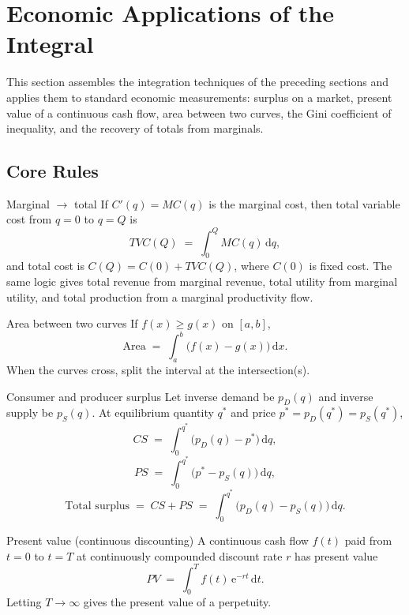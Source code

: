 \chapter{Economic Applications of the Integral}

This section assembles the integration techniques of the preceding
sections and applies them to standard economic measurements: surplus on
a market, present value of a continuous cash flow, area between two
curves, the Gini coefficient of inequality, and the recovery of totals
from marginals.

\section{Core Rules}

\begin{rulebox}{Marginal $\to$ total}
If $C'(q)=MC(q)$ is the marginal cost, then total variable cost from
$q=0$ to $q=Q$ is
\[
  TVC(Q) \;=\; \int_{0}^{Q} MC(q)\,\mathrm{d}q,
\]
and total cost is $C(Q)=C(0)+TVC(Q)$, where $C(0)$ is fixed cost. The
same logic gives total revenue from marginal revenue, total utility from
marginal utility, and total production from a marginal productivity
flow.
\end{rulebox}

\begin{rulebox}{Area between two curves}
If $f(x)\ge g(x)$ on $[a,b]$,
\[
  \text{Area} \;=\; \int_{a}^{b} \bigl(f(x)-g(x)\bigr)\,\mathrm{d}x .
\]
When the curves cross, split the interval at the intersection(s).
\end{rulebox}

\begin{rulebox}{Consumer and producer surplus}
Let inverse demand be $p_D(q)$ and inverse supply be $p_S(q)$. At
equilibrium quantity $q^{*}$ and price $p^{*}=p_D(q^{*})=p_S(q^{*})$,
\[
  CS \;=\; \int_{0}^{q^{*}} \bigl(p_D(q)-p^{*}\bigr)\,\mathrm{d}q,
\]
\[
  PS \;=\; \int_{0}^{q^{*}} \bigl(p^{*}-p_S(q)\bigr)\,\mathrm{d}q,
\]
\[
  \text{Total surplus} \;=\; CS+PS \;=\; \int_{0}^{q^{*}} \bigl(p_D(q)-p_S(q)\bigr)\,\mathrm{d}q .
\]
\end{rulebox}

\begin{rulebox}{Present value (continuous discounting)}
A continuous cash flow $f(t)$ paid from $t=0$ to $t=T$ at continuously
compounded discount rate $r$ has present value
\[
  PV \;=\; \int_{0}^{T} f(t)\,\mathrm{e}^{-rt}\,\mathrm{d}t .
\]
Letting $T\to\infty$ gives the present value of a perpetuity.
\end{rulebox}

